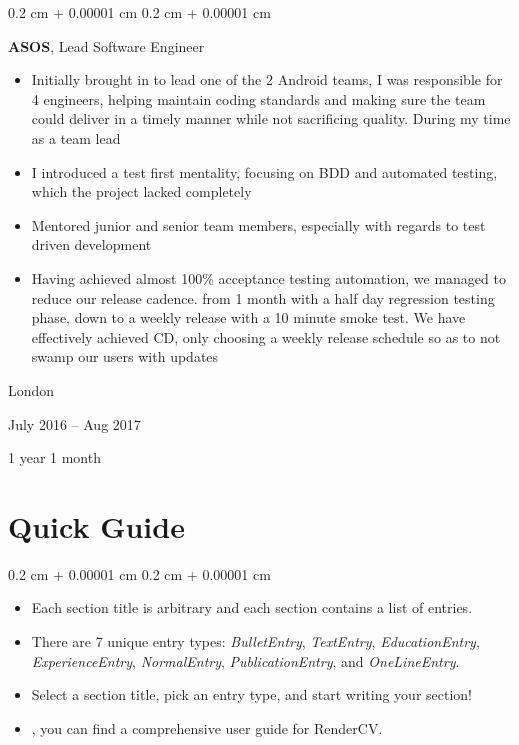 \documentclass[10pt, letterpaper]{article}
\newenvironment{highlights}{
    \begin{itemize}[
        topsep=0.10 cm,
        parsep=0.10 cm,
        partopsep=0pt,
        itemsep=0pt,
        leftmargin=0.4 cm + 10pt
    ]
}{
    \end{itemize}
} %
\newenvironment{highlightsforbulletentries}{
    \begin{itemize}[
        topsep=0.10 cm,
        parsep=0.10 cm,
        partopsep=0pt,
        itemsep=0pt,
        leftmargin=10pt
    ]
}{
    \end{itemize}
} %
\newenvironment{onecolentry}{
    \begin{adjustwidth}{
        0.2 cm + 0.00001 cm
    }{
        0.2 cm + 0.00001 cm
    }
}{
    \end{adjustwidth}
} %
\newenvironment{twocolentry}[2][]{
    \onecolentry
    \def\secondColumn{#2}
    \setcolumnwidth{\fill, 4.5 cm}
    \begin{paracol}{2}
}{
    \switchcolumn \raggedleft \secondColumn
    \end{paracol}
    \endonecolentry
} %
\let\hrefWithoutArrow\href
\renewcommand{\href}[2]{\hrefWithoutArrow{#1}{\ifthenelse{\equal{#2}{}}{ }{#2 }\raisebox{.15ex}{\footnotesize \faExternalLink*}}}
\begin{document}
        \vspace{0.2 cm}

        \begin{twocolentry}{
            London

        July 2016 – Aug 2017

        1 year 1 month
        }
            \textbf{ASOS}, Lead Software Engineer
            \begin{highlights}
                \item Initially brought in to lead one of the 2 Android teams, I was responsible for 4 engineers, helping maintain coding standards and making sure the team could deliver in a timely manner while not sacrificing quality. During my time as a team lead
                \item I introduced a test first mentality, focusing on BDD and automated testing, which the project lacked completely
                \item Mentored junior and senior team members, especially with regards to test driven development
                \item Having achieved almost 100\% acceptance testing automation, we managed to reduce our release cadence. from 1 month with a half day regression testing phase, down to a weekly release with a 10 minute smoke test. We have effectively achieved CD, only choosing a weekly release schedule so as to not swamp our users with updates
            \end{highlights}
        \end{twocolentry}



    
    \section{Quick Guide}

    \begin{onecolentry}
        \begin{highlightsforbulletentries}


        \item Each section title is arbitrary and each section contains a list of entries.

        \item There are 7 unique entry types: \textit{BulletEntry}, \textit{TextEntry}, \textit{EducationEntry}, \textit{ExperienceEntry}, \textit{NormalEntry}, \textit{PublicationEntry}, and \textit{OneLineEntry}.

        \item Select a section title, pick an entry type, and start writing your section!

        \item \href{https://docs.rendercv.com/user_guide/}{Here}, you can find a comprehensive user guide for RenderCV.


        \end{highlightsforbulletentries}
    \end{onecolentry}
\end{document}
